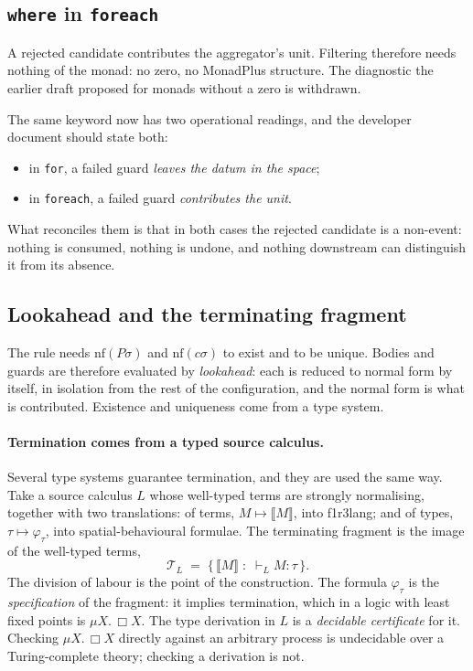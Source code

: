 \documentclass[11pt]{article}
\theoremstyle{branddef}
\theoremstyle{brandplain}
\theoremstyle{brandrem}
\newcommand{\sem}[1]{\llbracket #1 \rrbracket}
\newcommand{\nf}{\mathrm{nf}}
\newcommand{\fe}{\texttt{foreach}}
\newcommand{\flang}{\textsf{f1r3lang}}
\begin{document}
\subsection{\texttt{where} in \texttt{foreach}}
\label{sec:where}

A rejected candidate contributes the aggregator's unit. Filtering therefore
needs nothing of the monad: no zero, no MonadPlus structure. The diagnostic the
earlier draft proposed for monads without a zero is withdrawn.

The same keyword now has two operational readings, and the developer document
should state both:
\begin{itemize}[nosep]
\item in \texttt{for}, a failed guard \emph{leaves the datum in the space};
\item in \fe{}, a failed guard \emph{contributes the unit}.
\end{itemize}
What reconciles them is that in both cases the rejected candidate is a
non-event: nothing is consumed, nothing is undone, and nothing downstream can
distinguish it from its absence.

\subsection{Lookahead and the terminating fragment}
\label{sec:lookahead}

The rule needs \(\nf(P\sigma)\) and \(\nf(c\sigma)\) to exist and to be unique.
Bodies and guards are therefore evaluated by \emph{lookahead}: each is reduced
to normal form by itself, in isolation from the rest of the configuration, and
the normal form is what is contributed. Existence and uniqueness come from a
type system.

\paragraph{Termination comes from a typed source calculus.} Several type
systems guarantee termination, and they are used the same way. Take a source
calculus \(L\) whose well-typed terms are strongly normalising, together with
two translations: of terms, \(M \mapsto \sem{M}\), into \flang{}; and of types,
\(\tau \mapsto \varphi_\tau\), into spatial-behavioural formulae. The
terminating fragment is the image of the well-typed terms,
\[
\mathcal{T}_L \;=\; \{\, \sem{M} \;:\; \vdash_L M : \tau \,\}.
\]
The division of labour is the point of the construction. The formula
\(\varphi_\tau\) is the \emph{specification} of the fragment: it implies
termination, which in a logic with least fixed points is \(\mu X.\,\Box X\).
The type derivation in \(L\) is a \emph{decidable certificate} for it. Checking
\(\mu X.\,\Box X\) directly against an arbitrary process is undecidable over a
Turing-complete theory; checking a derivation is not.
\end{document}
